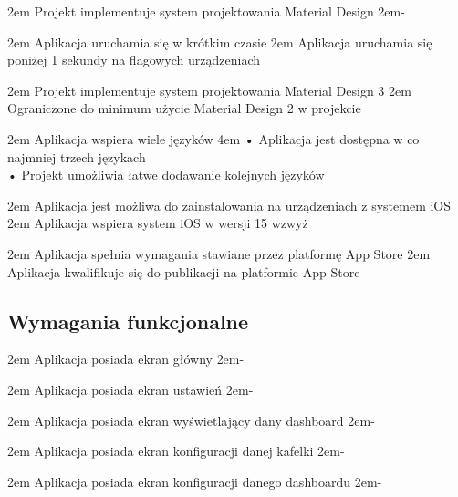 {2em}{
    Projekt implementuje system projektowania Material Design
}
{2em}{-}

{2em}{
    Aplikacja uruchamia się w krótkim czasie
}
{2em}{
    Aplikacja uruchamia się poniżej 1 sekundy na flagowych urządzeniach
}

{2em}{
    Projekt implementuje system projektowania Material Design 3
}
{2em}{
    Ograniczone do minimum użycie Material Design 2 w projekcie
}

{2em}{
    Aplikacja wspiera wiele języków
}
{4em}{
    • Aplikacja jest dostępna w co najmniej trzech językach\\
    • Projekt umożliwia łatwe dodawanie kolejnych języków
}

{2em}{
    Aplikacja jest możliwa do zainstalowania na urządzeniach z systemem iOS
}
{2em}{
    Aplikacja wspiera system iOS w wersji 15 wzwyż
}

{2em}{
    Aplikacja spełnia wymagania stawiane przez platformę App Store
}
{2em}{
    Aplikacja kwalifikuje się do publikacji na platformie App Store
}

\newpage

\subsection{Wymagania funkcjonalne}{}

{2em}{
    Aplikacja posiada ekran główny
}
{2em}{-}

{2em}{
    Aplikacja posiada ekran ustawień
}
{2em}{-}

{2em}{
    Aplikacja posiada ekran wyświetlający dany dashboard
}
{2em}{-}

{2em}{
    Aplikacja posiada ekran konfiguracji danej kafelki
}
{2em}{-}

{2em}{
    Aplikacja posiada ekran konfiguracji danego dashboardu
}
{2em}{-}


